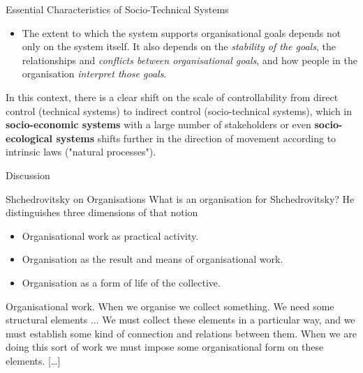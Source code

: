 \documentclass{beamer}
\begin{document}
\begin{frame}{Essential Characteristics of Socio-Technical Systems}
\begin{itemize}
\item The extent to which the system supports organisational goals depends not
  only on the system itself. It also depends on the \emph{stability of the
    goals}, the relationships and \emph{conflicts between organisational
    goals}, and how people in the organisation \emph{interpret those goals}.
\end{itemize}

In this context, there is a clear shift on the scale of controllability from
direct control (technical systems) to indirect control (socio-technical
systems), which in \textbf{socio-economic systems} with a large number of
stakeholders or even \textbf{socio-ecological systems} shifts further in the
direction of movement according to intrinsic laws ("natural processes").

\begin{center}\Large Discussion  \end{center}
  \end{frame}

\begin{frame}{Shchedrovitsky on Organisations}
What is an organisation for Shchedrovitsky? He distinguishes three dimensions
of that notion
\begin{itemize}
\item Organisational work as practical activity.
\item Organisation as the result and means of organisational work.
\item Organisation as a form of life of the collective.
\end{itemize}

\end{frame}

\begin{frame}{Organisational work.}
When we organise we collect something. We need some structural elements ...
We must collect these elements in a particular way, and we must establish some
kind of connection and relations between them. When we are doing this sort of
work we must impose some organisational form on these elements. [\ldots]

\end{frame}
\end{document}
